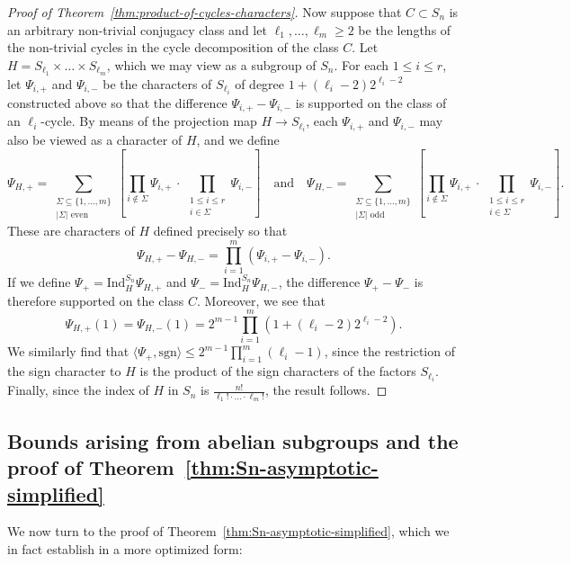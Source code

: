 \documentclass[12pt]{amsart}
\theoremstyle{definition} \newtheorem{definition}[theorem]{Definition}
\theoremstyle{example} \newtheorem{example}[theorem]{Example}
\theoremstyle{remark} \newtheorem{remark}{Remark}[theorem]
\numberwithin{equation}{section}
\numberwithin{theorem}{section}
\renewcommand{\leq}{\leqslant}
\renewcommand{\geq}{\geqslant}
\begin{document}
\begin{proof} [Proof of Theorem~\ref{thm:product-of-cycles-characters}]
		Now suppose that $C \subset S_n$ is an arbitrary non-trivial conjugacy class and let $\ell_1,\dots,\ell_m \geq 2$ be the lengths of the non-trivial cycles in the cycle decomposition of the class $C$.  Let $H = S_{\ell_1} \times \dots \times S_{\ell_m}$, which we may view as a subgroup of $S_n$.
		For each $1 \leq i \leq r$, let $\Psi_{i,+}$ and $\Psi_{i,-}$ be the characters of $S_{\ell_i}$ of degree $1+(\ell_i-2)2^{\ell_i-2}$ constructed above so that the difference $\Psi_{i,+} - \Psi_{i,-}$ is supported on the class of an $\ell_i$-cycle.  By means of the projection map $H \to S_{\ell_i}$, each $\Psi_{i,+}$ and $\Psi_{i,-}$ may also be viewed as a character of $H$, and we define
			\[
				\Psi_{H,+} = \sum_{ \substack{ \Sigma \subseteq \{1,\dots,m\} \\ |\Sigma| \text{ even}}} \left[\prod_{i \not \in \Sigma} \Psi_{i,+} \,\cdot\, \prod_{\substack{ 1 \leq i \leq r \\ i \in \Sigma}} \Psi_{i,-} \right]
					\quad \text{and} \quad
				\Psi_{H,-} = \sum_{ \substack{ \Sigma \subseteq \{1,\dots,m\} \\ |\Sigma| \text{ odd}}} \left[\prod_{i \not\in \Sigma} \Psi_{i,+} \,\cdot\, \prod_{\substack{ 1 \leq i \leq r \\ i \in \Sigma}} \Psi_{i,-} \right].	
			\]
		These are characters of $H$ defined precisely so that 
			\[
				\Psi_{H,+} - \Psi_{H,-} 
					= \prod_{i=1}^m (\Psi_{i,+} - \Psi_{i,-}).
			\]
		If we define $\Psi_+ = \mathrm{Ind}_H^{S_n} \Psi_{H,+}$ and $\Psi_- = \mathrm{Ind}_H^{S_n} \Psi_{H,-}$, the difference $\Psi_+ - \Psi_-$ is therefore supported on the class $C$.  Moreover, we see that 
			\[
				\Psi_{H,+}(1) = \Psi_{H,-}(1) = 2^{m-1} \prod_{i=1}^m (1 + (\ell_i-2)2^{\ell_i-2}).
			\]
		We similarly find that $\langle \Psi_+, \mathrm{sgn} \rangle \leq 2^{m-1} \prod_{i=1}^m (\ell_i-1)$, since the restriction of the sign character to $H$ is the product of the sign characters of the factors $S_{\ell_i}$.
		Finally, since the index of $H$ in $S_n$ is $\frac{n!}{\ell_1! \cdot \dots \cdot \ell_m!}$, the result follows.
	\end{proof}
	
\subsection{Bounds arising from abelian subgroups and the proof of Theorem~\ref{thm:Sn-asymptotic-simplified}}
	
	We now turn to the proof of Theorem~\ref{thm:Sn-asymptotic-simplified}, which we in fact establish in a more optimized form:
	
\end{document}
